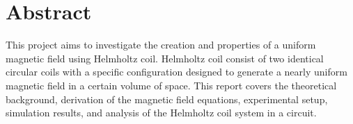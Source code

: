 \chapter{Abstract}

This project aims to investigate the creation and properties of a uniform magnetic field using Helmholtz coil. Helmholtz coil consist of two identical circular coils with a specific configuration designed to generate a nearly uniform magnetic field in a certain volume of space. This report covers the theoretical background, derivation of the magnetic field equations, experimental setup, simulation results, and analysis of the Helmholtz coil system in a circuit.
